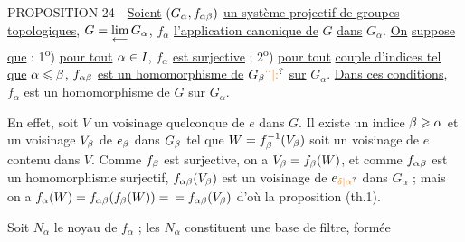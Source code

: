 PROPOSITION 24 - \uline{Soient} $(G_\alpha,f_{\alpha\beta})$ \uline{un système projectif de groupes}
\uline{topologiques}, $G=\underset{\longleftarrow}{\lim}\,G_\alpha$, $f_\alpha$ \uline{l'application canonique de} $G$ \uline{dans} $G_\alpha$. \uline{On}
\uline{suppose que} : 1\textsuperscript{o}) \uline{pour tout} $\alpha\in I$, $f_\alpha$ \uline{est surjective} ; 2\textsuperscript{o}) \uline{pour tout}
\uline{couple d'indices tel que} $\alpha\leqslant\beta$, $f_{\alpha\beta}$ \uline{est un homomorphisme de} $G_{\handwritten{\beta}}\unsure{{}^{\cdot\cdot}|{:}}$ \uline{sur}
$G_\alpha$. \uline{Dans ces conditions}, $f_\alpha$ \uline{est un homomorphisme de} $G$ \uline{sur} $G_\alpha$.

En effet, soit $V$ un voisinage quelconque de $e$ dans $G$. Il existe un
indice $\beta\geqslant\alpha$ et un voisinage $V_{\beta}$ de $e_{\beta}$ dans $G_{\beta}$ tel que $W=f^{-1}_{\beta}(V_{\beta})$
soit un voisinage de $e$ contenu dans $V$. Comme $f_{\beta}$ est surjective, on a
$V_{\beta}=f_{\beta}(W)$, et comme $f_{\alpha\beta}$ est un homomorphisme surjectif, $f_{\alpha\beta}(V_{\beta})$
est un voisinage de $e_{\handwritten{\unsure{\delta|\alpha}}}$ dans $G_\alpha$ ; mais on a $f_\alpha(W)=f_{\alpha\beta}(f_{\beta}(W))=$
$=f_{\alpha\beta}(V_{\beta})$ d'où la proposition (th.1).

Soit $N_\alpha$ le noyau de $f_\alpha$ ; les $N_\alpha$ constituent une base de filtre, formée



